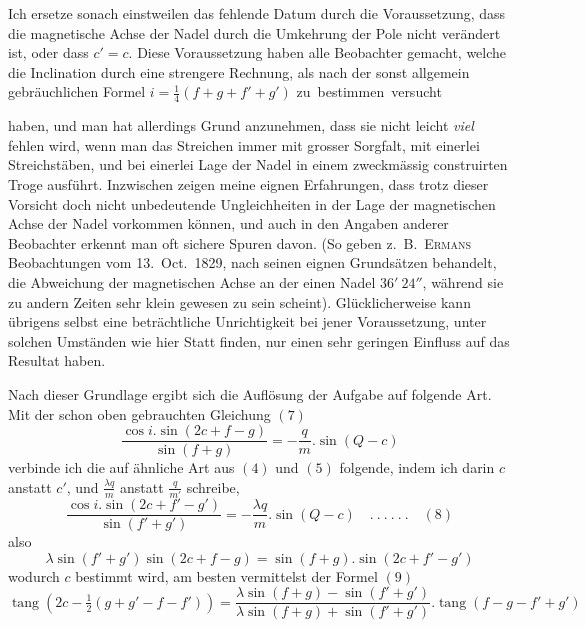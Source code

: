 Ich ersetze sonach einstweilen das fehlende Datum durch die Voraussetzung, dass die magnetische Achse der Nadel durch die Umkehrung der Pole nicht verändert ist, oder dass $c'=c$. Diese Voraussetzung haben alle Beobachter gemacht, welche die Inclination durch eine strengere Rechnung, als nach der sonst allgemein gebräuchlichen Formel $i=\frac14(f+g+f'+g')$ \mbox{zu bestimmen versucht}
\par\clearpage
{}
\noindent haben, und man hat allerdings Grund anzunehmen, dass sie nicht leicht \textit{viel} fehlen wird, wenn man das Streichen immer mit grosser Sorgfalt, mit einerlei Streichstäben, und bei einerlei Lage der Nadel in einem zweckmässig construirten Troge ausführt. Inzwischen zeigen meine eignen Erfahrungen, dass trotz dieser Vorsicht doch nicht unbedeutende Ungleichheiten in der Lage der magnetischen Achse der Nadel vorkommen können, und auch in den Angaben anderer Beobachter erkennt man oft sichere Spuren davon. (So geben z.\ B.\ \textsc{Ermans} Beobachtungen vom 13.\ Oct.\ 1829, nach seinen eignen Grundsätzen behandelt, die Abweichung der magnetischen Achse an der einen Nadel $36'\ 24''$, während sie zu andern Zeiten sehr klein gewesen zu sein scheint). Glücklicherweise kann übrigens selbst eine beträchtliche Unrichtigkeit bei jener Voraussetzung, unter solchen Umständen wie hier Statt finden, nur einen sehr geringen Einfluss auf das Resultat haben.

Nach dieser Grundlage ergibt sich die Auflösung der Aufgabe auf folgende Art. Mit der schon oben gebrauchten Gleichung $(7)$
\[
\frac{\cos i.\sin(2c+f-g)}{\sin(f+g)}=-\frac{q}{m}.\sin(Q-c)
\]
verbinde ich die auf ähnliche Art aus $(4)$ und $(5)$ folgende, indem ich darin $c$ anstatt $c'$, und $\frac{\lambda q}{m}$ anstatt $\frac{q}{m'}$ schreibe,
\[
\frac{\cos i.\sin(2c+f'-g')}{\sin(f'+g')}=-\frac{\lambda q}{m}.\sin(Q-c)\quad.\ .\ .\ .\ .\ .\quad(8)
\]
also
\[
\lambda\sin(f'+g')\sin(2c+f-g)=\sin(f+g).\sin(2c+f'-g')
\]
wodurch $c$ bestimmt wird, am besten vermittelst der Formel $(9)$
\[
\operatorname{tang}(2c-\tfrac12(g+g'-f-f'))=\frac{\lambda\sin(f+g)-\sin(f'+g')}{\lambda\sin(f+g)+\sin(f'+g')}.\operatorname{tang}(f-g-f'+g')
\]

